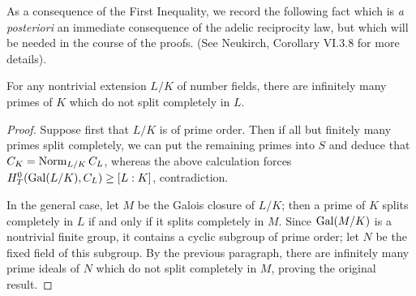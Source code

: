 As a consequence of the First Inequality, we record the following fact which is \emph{a posteriori} an immediate consequence of the adelic reciprocity law, but which will be needed in the course of the proofs.
(See Neukirch, Corollary VI.3.8 for more details).
\begin{cor} \label{C:split completely}
For any nontrivial extension $L/K$ of number fields, there are infinitely many primes of $K$ which do not split completely in $L$.
\end{cor}
\begin{proof}
Suppose first that $L/K$ is of prime order. Then if all but finitely many
primes split completely, we can put the remaining primes into $S$ and
deduce that $C_K = \operatorname{Norm}_{L/K} C_L$, whereas the above calculation
forces $H^0_T(\operatorname{Gal}(L/K), C_L) \geq [L:K]$, contradiction.

In the general case, let $M$ be the Galois closure of $L/K$; then a prime of $K$ splits completely in $L$ if and only if it splits completely in $M$. Since $\operatorname{Gal}(M/K)$ is a nontrivial finite group, it contains a cyclic subgroup of prime order; let $N$ be the fixed field of this subgroup. By the previous paragraph, there are infinitely many prime ideals of $N$ which do not split completely in $M$, proving the original result.
\end{proof}

%
